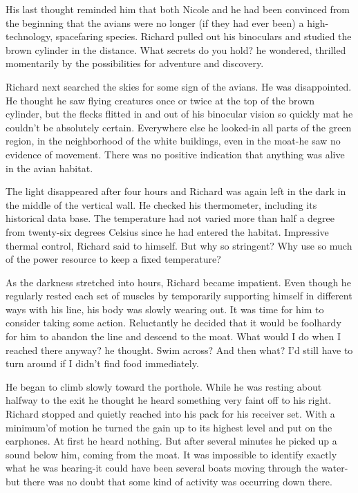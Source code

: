 \documentclass[]{article}
\begin{document}
{His last thought reminded him that both Nicole and he had been convinced from the beginning that the avians were no longer (if they had ever been) a high-technology, spacefaring species.  Richard pulled out his binoculars and studied the brown cylinder in the distance.  What secrets do you hold? he wondered, thrilled momentarily by the possibilities for adventure and discovery.

Richard next searched the skies for some sign of the avians.  He was disappointed.  He thought he saw flying creatures once or twice at the top of the brown cylinder, but the flecks flitted in and out of his binocular vision so quickly mat he couldn’t be absolutely certain.  Everywhere else he looked-in all parts of the green region, in the neighborhood of the white buildings, even in the moat-he saw no evidence of movement.  There was no positive indication that anything was alive in the avian habitat.

The light disappeared after four hours and Richard was again left in the dark in the middle of the vertical wall.  He checked his thermometer, including its historical data base.  The temperature had not varied more than half a degree from twenty-six degrees Celsius since he had entered the habitat.  Impressive thermal control, Richard said to himself.  But why so stringent? Why use so much of the power resource to keep a fixed temperature?

As the darkness stretched into hours, Richard became impatient.  Even though he regularly rested each set of muscles by temporarily supporting himself in different ways with his line, his body was slowly wearing out.  It was time for him to consider taking some action.  Reluctantly he decided that it would be foolhardy for him to abandon the line and descend to the moat.  What would I do when I reached there anyway? he thought.  Swim across? And then what? I’d still have to turn around if I didn’t find food immediately.

He began to climb slowly toward the porthole.  While he was resting about halfway to the exit he thought he heard something very faint off to his right.  Richard stopped and quietly reached into his pack for his receiver set.  With a minimum’of motion he turned the gain up to its highest level and put on the earphones.  At first he heard nothing.  But after several minutes he picked up a sound below him, coming from the moat.  It was impossible to identify exactly what he was hearing-it could have been several boats moving through the water-but there was no doubt that some kind of activity was occurring down there.

}
\end{document}
